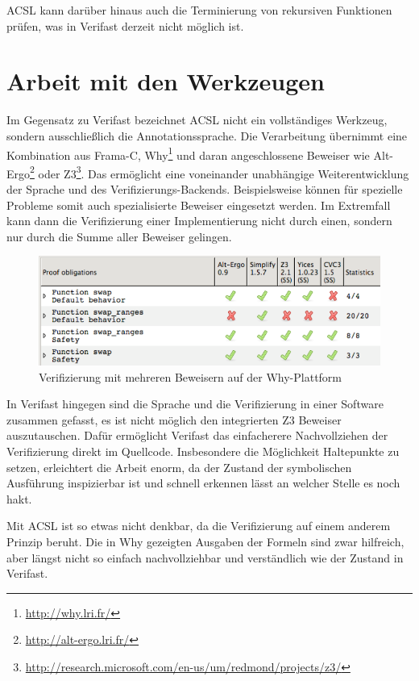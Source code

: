 ACSL kann darüber hinaus auch die Terminierung von rekursiven Funktionen prüfen, was in
Verifast derzeit nicht möglich ist.


\section{Arbeit mit den Werkzeugen}

Im Gegensatz zu Verifast bezeichnet ACSL nicht ein vollständiges Werkzeug, sondern ausschließlich
die Annotationssprache. Die Verarbeitung übernimmt eine Kombination aus Frama-C, Why\footnote{
\url{http://why.lri.fr/}} und daran angeschlossene Beweiser wie Alt-Ergo\footnote{\url{http://alt-ergo.lri.fr/}}
oder Z3\footnote{\url{http://research.microsoft.com/en-us/um/redmond/projects/z3/}}. Das ermöglicht 
eine voneinander unabhängige Weiterentwicklung der Sprache und des Verifizierungs-Backends. Beispielsweise 
können für spezielle Probleme somit auch spezialisierte Beweiser eingesetzt werden. Im Extremfall kann
dann die Verifizierung einer Implementierung nicht durch einen, sondern nur durch die Summe aller
Beweiser gelingen.

\begin{figure}[H]
	\centering
\includegraphics[width=1.0\textwidth]{images/why-multiple-provers.png}
\caption{Verifizierung mit mehreren Beweisern auf der Why-Plattform}
\end{figure}

In Verifast hingegen sind die Sprache und die Verifizierung in einer Software zusammen gefasst,
es ist nicht möglich den integrierten Z3 Beweiser auszutauschen. Dafür ermöglicht Verifast das
einfacherere Nachvollziehen der Verifizierung direkt im Quellcode. Insbesondere die Möglichkeit
Haltepunkte zu setzen, erleichtert die Arbeit enorm, da der Zustand der symbolischen Ausführung
inspizierbar ist und schnell erkennen lässt an welcher Stelle es noch hakt.

Mit ACSL ist so etwas nicht denkbar, da die Verifizierung auf einem anderem Prinzip beruht. Die
in Why gezeigten Ausgaben der Formeln sind zwar hilfreich, aber längst nicht so einfach nachvollziehbar und
verständlich wie der Zustand in Verifast.

